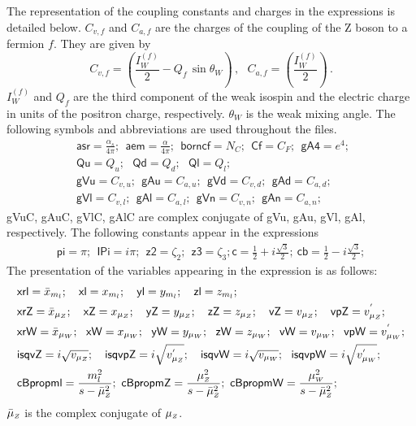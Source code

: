 \documentclass[11pt,a4paper]{article}
\begin{document}
%
The representation of the coupling constants and charges in the expressions
is detailed below.
%
$C_{v,f}$ and $C_{a,f}$ are the charges of the coupling of the Z boson to a
fermion $f$.
They are given by
\begin{equation}
 C_{v,f} = \left( \frac{I_W^{(f)}}{2} - Q_f \, \sin \theta_W  \right)\,, ~~~
 C_{a,f} = \left( \frac{I_W^{(f)}}{2}  \right)\,.
\end{equation}
%
$I_W^{(f)}$ and $Q_f$ are the third component of the weak isospin and the
electric charge in units
of the positron charge, respectively. $\theta_W$ is the weak mixing angle.
The following symbols and abbreviations are used throughout the files.
%
\begin{align}
&
\mathsf{asr} = \frac{\alpha_s}{4\pi}; ~~
\mathsf{aem} = \frac{\alpha}{4\pi}; ~~
\mathsf{borncf} = N_C; ~~
\mathsf{Cf} = C_F; ~~
\mathsf{gA4} = e^4; ~~
\nonumber\\&
\mathsf{Qu} = Q_u; ~~~
\mathsf{Qd} = Q_d; ~~~
\mathsf{Ql} = Q_l; ~~~
\nonumber\\&
\mathsf{gVu} = C_{v,u}; ~~
\mathsf{gAu} = C_{a,u}; ~~
\mathsf{gVd} = C_{v,d}; ~~
\mathsf{gAd} = C_{a,d}; ~~
\nonumber\\&
\mathsf{gVl} = C_{v,l}; ~~
\mathsf{gAl} = C_{a,l}; ~~
\mathsf{gVn} = C_{v,n}; ~~
\mathsf{gAn} = C_{a,n}; ~~
\end{align}
\noindent
\textsf{gVuC}, \textsf{gAuC}, \textsf{gVlC}, \textsf{gAlC} are complex
conjugate of \textsf{gVu}, \textsf{gAu}, \textsf{gVl}, \textsf{gAl},
respectively.
%
The following constants appear in the expressions
\begin{align}
\mathsf{pi} = \pi; ~~
\mathsf{IPi} = i \pi; ~~
\mathsf{z2} = \zeta_2; ~~
\mathsf{z3} = \zeta_3;
%
\mathsf{c}  = \frac{1}{2} + i \frac{\sqrt{3}}{2}; ~
\mathsf{cb} = \frac{1}{2} - i \frac{\sqrt{3}}{2};
%
\end{align}
%
%
The presentation of the variables appearing in the expression is as follows:
\begin{align}
&
\mathsf{xrl} = \bar{x}_{m_l}; ~~~
\mathsf{xl} = x_{m_l}; ~~~
\mathsf{yl} = y_{m_l}; ~~~
\mathsf{zl} = z_{m_l}; ~~~
\nonumber\\&
\mathsf{xrZ} = \bar{x}_{\mu_{\scriptscriptstyle Z}}; ~~~
\mathsf{xZ} = x_{\mu_{\scriptscriptstyle Z}}; ~~~
\mathsf{yZ} = y_{\mu_{\scriptscriptstyle Z}}; ~~~
\mathsf{zZ} = z_{\mu_{\scriptscriptstyle Z}}; ~~~
\mathsf{vZ} = v_{\mu_{\scriptscriptstyle Z}}; ~~~
\mathsf{vpZ} = v^{'}_{\mu_{\scriptscriptstyle Z}}; ~~~
\nonumber\\&
\mathsf{xrW} = \bar{x}_{\mu_{\scriptscriptstyle W}}; ~~
\mathsf{xW} = x_{\mu_{\scriptscriptstyle W}}; ~~
\mathsf{yW} = y_{\mu_{\scriptscriptstyle W}}; ~~
\mathsf{zW} = z_{\mu_{\scriptscriptstyle W}}; ~~
\mathsf{vW} = v_{\mu_{\scriptscriptstyle W}}; ~~
\mathsf{vpW} = v^{'}_{\mu_{\scriptscriptstyle W}};
\nonumber\\&
\mathsf{isqvZ} = i \sqrt{v_{\mu_{\scriptscriptstyle Z}}}; ~~~
\mathsf{isqvpZ} = i \sqrt{v^{'}_{\mu_{\scriptscriptstyle Z}}}; ~~~
\mathsf{isqvW} = i \sqrt{v_{\mu_{\scriptscriptstyle W}}}; ~~
\mathsf{isqvpW} = i \sqrt{v^{'}_{\mu_{\scriptscriptstyle W}}};
\nonumber\\&
\mathsf{cBpropml} = \frac{m_l^2}{s-\bar{\mu}_{{\scriptscriptstyle Z}}^2}; ~
\mathsf{cBpropmZ} = \frac{\mu_{\scriptscriptstyle Z}^2}{s-\bar{\mu}_{{\scriptscriptstyle Z}}^2}; ~
\mathsf{cBpropmW} = \frac{\mu_{\scriptscriptstyle W}^2}{s-\bar{\mu}_{{\scriptscriptstyle Z}}^2};
\end{align}
%
$\bar{\mu}_{{\scriptscriptstyle Z}}$ is the complex conjugate of $\mu_{\scriptscriptstyle Z}$.
%






\end{document}
